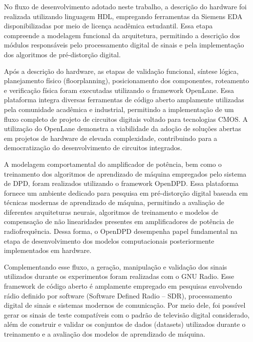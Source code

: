 \documentclass[journal,comsoc]{IEEEtran}
\begin{document}
No fluxo de desenvolvimento adotado neste trabalho, a descrição do hardware foi realizada utilizando linguagem HDL, empregando ferramentas da Siemens EDA disponibilizadas por meio de licença acadêmica estudantil. Essa etapa compreende a modelagem funcional da arquitetura, permitindo a descrição dos módulos responsáveis pelo processamento digital de sinais e pela implementação dos algoritmos de pré-distorção digital.

Após a descrição do hardware, as etapas de validação funcional, síntese lógica, planejamento físico (floorplanning), posicionamento dos componentes, roteamento e verificação física foram executadas utilizando o framework OpenLane. Essa plataforma integra diversas ferramentas de código aberto amplamente utilizadas pela comunidade acadêmica e industrial, permitindo a implementação de um fluxo completo de projeto de circuitos digitais voltado para tecnologias CMOS. A utilização do OpenLane demonstra a viabilidade da adoção de soluções abertas em projetos de hardware de elevada complexidade, contribuindo para a democratização do desenvolvimento de circuitos integrados.

A modelagem comportamental do amplificador de potência, bem como o treinamento dos algoritmos de aprendizado de máquina empregados pelo sistema de DPD, foram realizados utilizando o framework OpenDPD. Essa plataforma fornece um ambiente dedicado para pesquisa em pré-distorção digital baseada em técnicas modernas de aprendizado de máquina, permitindo a avaliação de diferentes arquiteturas neurais, algoritmos de treinamento e modelos de compensação de não linearidades presentes em amplificadores de potência de radiofrequência. Dessa forma, o OpenDPD desempenha papel fundamental na etapa de desenvolvimento dos modelos computacionais posteriormente implementados em hardware.

Complementando esse fluxo, a geração, manipulação e validação dos sinais utilizados durante os experimentos foram realizadas com o GNU Radio. Esse framework de código aberto é amplamente empregado em pesquisas envolvendo rádio definido por software (Software Defined Radio – SDR), processamento digital de sinais e sistemas modernos de comunicação. Por meio dele, foi possível gerar os sinais de teste compatíveis com o padrão de televisão digital considerado, além de construir e validar os conjuntos de dados (datasets) utilizados durante o treinamento e a avaliação dos modelos de aprendizado de máquina.
\end{document}
